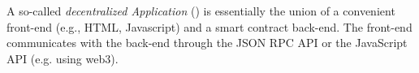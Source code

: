 \subsubsection{\dapp}

A so-called \emph{decentralized Application} (\dapp) is essentially the union of
a convenient front-end (e.g., HTML, Javascript) and a smart contract back-end.
The front-end communicates with the back-end through the JSON RPC API or the
JavaScript API (e.g. using web3).


 

